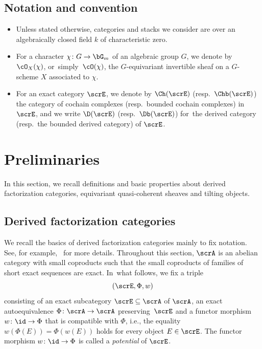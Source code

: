 \subsection{Notation and convention}
\begin{itemize}\itemsep=0pt

\item Unless stated otherwise, categories and stacks we consider are over an algebraically closed field $k$ of characteristic zero.

\item For a character $\chi\colon G\to \bG_m$ of an algebraic group $G$, we denote by $\cO_X(\chi)$, or~sim\-ply~$\cO(\chi)$, the $G$-equivariant invertible sheaf on a $G$-scheme $X$ associated to $\chi$.

\item For an exact category $\scrE$, we denote by $\Ch(\scrE)$ (resp.\ $\Chb(\scrE)$) the category of cochain complexes (resp.\ bounded cochain complexes) in $\scrE$, and we write $\D(\scrE)$ (resp.\ $\Db(\scrE)$) for~the derived category (resp.\ the bounded derived category) of $\scrE$.
\end{itemize}

\section{Preliminaries}%
In this section, we recall definitions and basic properties about derived factorization categories, equivariant quasi-coherent sheaves and tilting objects.

\subsection{Derived factorization categories}%
We recall the basics of derived factorization categories mainly to fix notation. See, for example,~\cite{bdfik,H1,posi} for more details.
Throughout this section, $\scrA$ is an abelian category with small coproducts such that the small coproducts of families of short exact sequences are exact. In~what follows, we fix a triple
\begin{equation}\label{triple}
(\scrE,\Phi,w)
\end{equation}
consisting of an exact subcategory $\scrE\subseteq\scrA$ of $\scrA$, an exact autoequivalence $\Phi\colon \scrA\to \scrA$ pre\-ser\-ving~$\scrE$ and a functor morphism $w\colon \id\to\Phi$ that is compatible with $\Phi$, i.e., the equality $w({\Phi(E)})=\Phi(w(E))$ holds for every object $E\in\scrE$. The functor morphism $w\colon \id\to\Phi$ is called a {\it potential} of $\scrE$.

